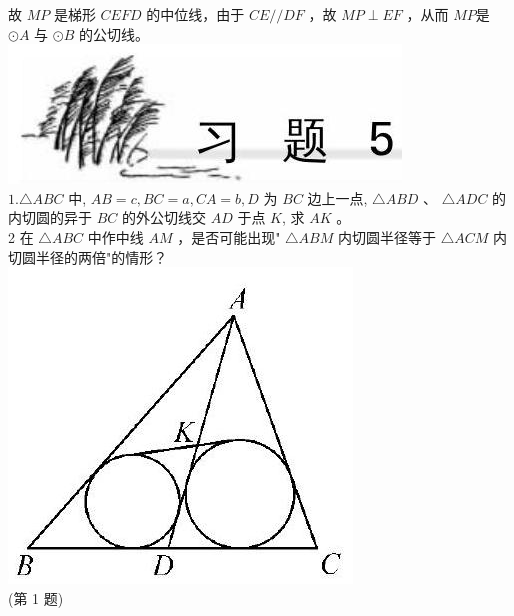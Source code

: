 \documentclass[10pt]{article}
\begin{document}
故 $M P$ 是梯形 $C E F D$ 的中位线，由于 $C E / / D F$ ，故 $M P \perp E F$ ，从而 $M P$是 $\odot A$ 与 $\odot B$ 的公切线。\\
\includegraphics[max width=\textwidth, center]{2024_10_30_66b8e5e701da2093c133g-041(1)}\\
$1 . \triangle A B C$ 中, $A B=c, B C=a, C A=b, D$ 为 $B C$ 边上一点, $\triangle A B D$ 、 $\triangle A D C$ 的内切圆的异于 $B C$ 的外公切线交 $A D$ 于点 $K$, 求 $A K$ 。\\
2 在 $\triangle A B C$ 中作中线 $A M$ ，是否可能出现" $\triangle A B M$ 内切圆半径等于 $\triangle A C M$ 内切圆半径的两倍"的情形？\\
\includegraphics[max width=\textwidth, center]{2024_10_30_66b8e5e701da2093c133g-041(4)}\\
(第 1 题)\\
\end{document}
